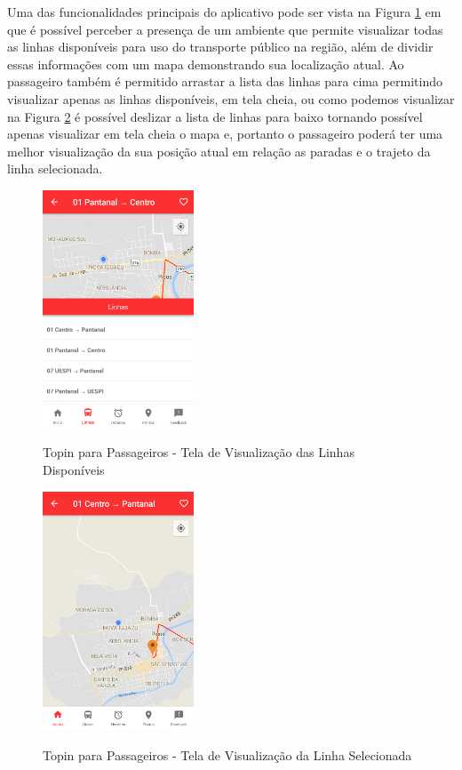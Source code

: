 {{{{{{{Uma das funcionalidades principais do aplicativo pode ser vista na Figura \ref{fig:passageiro-linhas-disponiveis} em que é possível perceber a presença de um ambiente que permite visualizar todas as linhas disponíveis para uso do transporte público na região, além de dividir essas informações com um mapa demonstrando sua localização atual. Ao passageiro também é permitido arrastar a lista das linhas para cima permitindo visualizar apenas as linhas disponíveis, em tela cheia, ou como podemos visualizar na Figura \ref{fig:passageiro-visualizacao-linha} é possível deslizar a lista de linhas para baixo tornando possível apenas visualizar em tela cheia o mapa e, portanto o passageiro poderá ter uma melhor visualização da sua posição atual em relação as paradas e o trajeto da linha selecionada.

\begin{figure}[t]
\caption{Topin para Passageiros - Tela de Visualização das Linhas Disponíveis}
\centering
\includegraphics[width=0.4\textwidth]{imagens/linhas-disponiveis.png}
\label{fig:passageiro-linhas-disponiveis}
\end{figure}

\begin{figure}[H]
\caption{Topin para Passageiros - Tela de Visualização da Linha Selecionada}
\centering
\includegraphics[width=0.4\textwidth]{imagens/visualizacao-linha.png}
\label{fig:passageiro-visualizacao-linha}
\end{figure}

}}}}}}}
